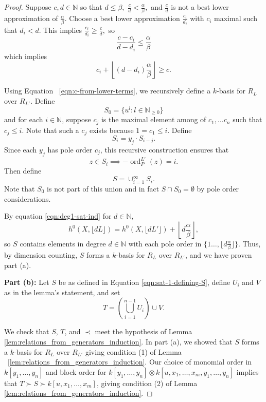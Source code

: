 \documentclass{amsart}
\theoremstyle{plain}
\theoremstyle{definition}
\theoremstyle{remark}
\numberwithin{equation}{section}
\newcommand\BN{{\mathbb N}}
\DeclareMathOperator{\ord}{ord}
\newcommand{\halfcan}{L}
\begin{document}
\begin{proof}
Suppose $c,d \in \BN$ so that $d\le \beta,$  $\frac{c}{d} < \frac{\alpha}{
\beta},$ and $\frac{c}{d}$ is not a best lower approximation of $\frac{\alpha}{\beta}$. Choose a
best lower approximation $\frac{c_i}{d_i}$ with $c_i$ maximal such that $d_i< d$.  This implies $\frac{c_i}{d_i}\ge \frac{c}{d},$ so 
\[
	\frac{c-c_i}{d-d_i}\le \frac{\alpha}{\beta}
\]
which implies
\begin{equation}\label{eqn:c-from-lower-terms}
	c_i +\left\lfloor (d-d_i) \frac{\alpha}{\beta} \right\rfloor \ge c.
\end{equation}

Using Equation ~\ref{eqn:c-from-lower-terms}, we recursively define a $k$-basis for $R_\halfcan$ over $R_{\halfcan'}$. Define 
\[
	S_0 = \{u^l : l \in \BN_{\ge 0}\}
\]
and for each $i \in \BN$, suppose $c_j$ is the maximal element among of $c_1, \ldots c_n$ such that $c_j \le i.$ Note that such a $c_j$ exists because $1=c_1\le i.$ Define
\[
	S_i = y_j \cdot S_{i-j}.
\]
Since each $y_j$ has pole order $c_j$, this recursive construction ensures that 
\[
	z\in S_i \implies -\ord_P^{\halfcan'}(z)=i.
\]
Then define 
\begin{equation}\label{eqn:sat-1-defining-S}
	S = \cup_{i=1}^{\infty} S_i.  
\end{equation}
Note that $S_0$ is not part of this union and in fact $S\cap S_0 = \emptyset$ by pole order considerations.

By equation \ref{eqn:deg1-sat-ind} for $d \in \BN$,
\[
	h^0(X, \lfloor{d\halfcan}\rfloor) = h^0(X, \lfloor d\halfcan'
		\rfloor) + \left\lfloor d\frac{\alpha} {\beta} \right \rfloor,
\] 
so $S$ contains elements in degree $d \in \BN$ with each pole order in $\{1 \ldots, \lfloor d\frac{\alpha}{\beta}\rfloor\}$.  Thus, by dimension counting, $S$ forms a $k$-basis for $R_\halfcan$ over $R_{\halfcan'}$, and we have proven part (a).

{\bf Part (b):}
Let $S$ be as defined in Equation \ref{eqn:sat-1-defining-S}, define $U_i$ and $V$ as in the lemma's statement, and set
\[
	T = \left(\bigcup_{i=1}^{n-1} U_i \right) \cup V.
\]

We check that $S$, $T$, and $\prec$ meet the hypothesis of Lemma \ref{lem:relations_from_generators_induction}.  In part (a), we showed that $S$ forms a $k$-basis for $R_\halfcan$ over $R_{\halfcan'}$ giving condition (1) of Lemma ~\ref{lem:relations_from_generators_induction}.  Our choice of monomial order in $k[y_1, \ldots, y_n]$ and block order for $k[y_1, \ldots, y_n]\otimes k[u, x_1, \ldots, x_m, y_1, \ldots, y_n]$ implies that $T\succ S\succ k[u, x_1, \ldots, x_m]$, giving condition (2) of Lemma \ref{lem:relations_from_generators_induction}.  


\end{proof}
\end{document}
